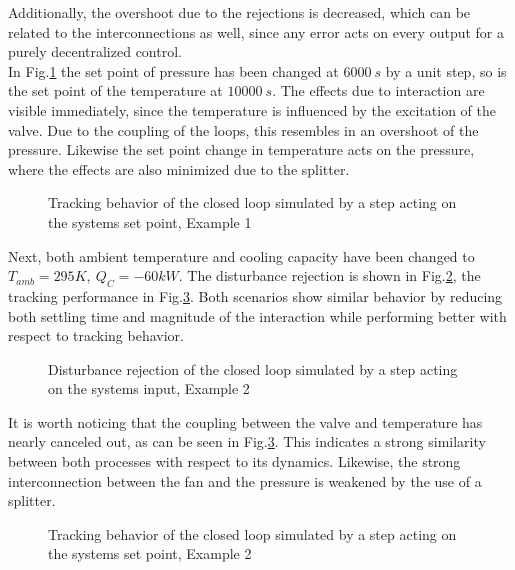 Additionally, the overshoot due to the rejections is decreased, which can be related to the interconnections as well, since any error acts on every output for a purely decentralized control.\\

In Fig.\ref{c:physical:f:tracking1} the set point of pressure has been changed at $6000~s$ by a unit step, so is the set point of the temperature at $10000~s$. The effects due to interaction are visible immediately, since the temperature is influenced by the excitation of the valve. Due to the coupling of the loops, this resembles in an overshoot of the pressure. Likewise the set point change in temperature acts on the pressure, where the effects are also minimized due to the splitter.

\begin{figure}[H]

\caption{Tracking behavior of the closed loop simulated by a step acting on the systems set point, Example 1}
\label{c:physical:f:tracking1}
\end{figure}

Next, both ambient temperature and cooling capacity have been changed to 
$T_{amb} = 295 K,~Q_C = -60 kW$. The disturbance rejection is shown in Fig.\ref{c:physical:f:disturbance2}, the tracking performance in Fig.\ref{c:physical:f:tracking2}. Both scenarios show similar behavior by reducing both settling time and magnitude of the interaction while performing better with respect to tracking behavior.

\begin{figure}[H]

\caption{Disturbance rejection of the closed loop simulated by a step acting on the systems input, Example 2}
\label{c:physical:f:disturbance2}
\end{figure}

It is worth noticing that the coupling between the valve and temperature has nearly canceled out, as can be seen in Fig.\ref{c:physical:f:tracking2}. This indicates a strong similarity between both processes with respect to its dynamics. Likewise, the strong interconnection between the fan and the pressure is weakened by the use of a splitter.

\begin{figure}[H]

\caption{Tracking behavior of the closed loop simulated by a step acting on the systems set point, Example 2}
\label{c:physical:f:tracking2}
\end{figure}

